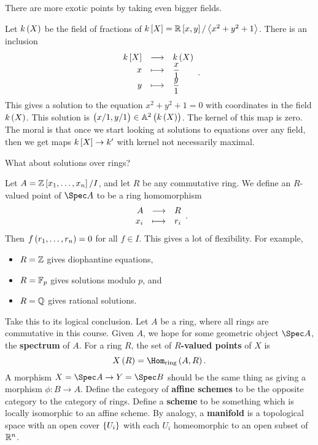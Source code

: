 
There are more exotic points by taking even bigger fields.

\begin{example*}
Let $ k\br{X} $ be the field of fractions of $ k\sbr{X} = \RR\sbr{x, y} / \abr{x^2 + y^2 + 1} $. There is an inclusion
$$ \functions{k\sbr{X}}{k\br{X}}{x}{\dfrac{x}{1}}{y}{\dfrac{y}{1}}. $$
This gives a solution to the equation $ x^2 + y^2 + 1 = 0 $ with coordinates in the field $ k\br{X} $. This solution is $ \br{x / 1, y / 1} \in \AA^2\br{k\br{X}} $. The kernel of this map is zero. The moral is that once we start looking at solutions to equations over any field, then we get maps $ k\sbr{X} \to k' $ with kernel not necessarily maximal.
\end{example*}

What about solutions over rings?

\pagebreak

\begin{example*}
Let $ A = \ZZ\sbr{x_1, \dots, x_n} / I $, and let $ R $ be any commutative ring. We define an $ R $-valued point of $ \Spec A $ to be a ring homomorphism
$$ \function{A}{R}{x_i}{r_i}. $$
Then $ f\br{r_1, \dots, r_n} = 0 $ for all $ f \in I $. This gives a lot of flexibility. For example,
\begin{itemize}
\item $ R = \mathbb{Z} $ gives diophantine equations,
\item $ R = \mathbb{F}_p $ gives solutions modulo $ p $, and
\item $ R = \mathbb{Q} $ gives rational solutions.
\end{itemize}
\end{example*}

Take this to its logical conclusion. Let $ A $ be a ring, where all rings are commutative in this course. Given $ A $, we hope for some geometric object $ \Spec A $, the \textbf{spectrum} of $ A $. For a ring $ R $, the set of \textbf{$ R $-valued points} of $ X $ is
$$ X\br{R} = \Hom_{\text{ring}}\br{A, R}. $$
A morphism $ X = \Spec A \to Y = \Spec B $ should be the same thing as giving a morphism $ \phi : B \to A $. Define the category of \textbf{affine schemes} to be the opposite category to the category of rings. Define a \textbf{scheme} to be something which is locally isomorphic to an affine scheme. By analogy, a \textbf{manifold} is a topological space with an open cover $ \cbr{U_i} $ with each $ U_i $ homeomorphic to an open subset of $ \mathbb{R}^n $.

